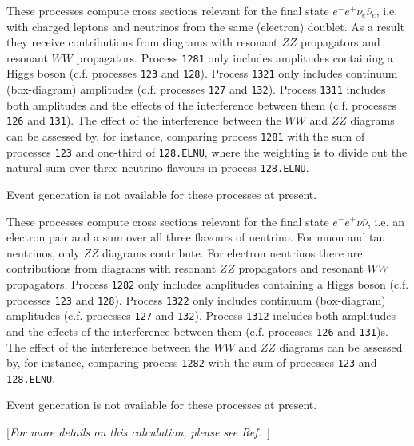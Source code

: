 These processes compute cross sections relevant for the final state
$e^- e^+ \nu_e \bar \nu_e$, i.e. with charged leptons and neutrinos from the
same (electron) doublet.  As a result they receive contributions from diagrams
with resonant $ZZ$ propagators and resonant $WW$ propagators.  Process
{\tt 1281} only includes amplitudes containing a Higgs boson (c.f. processes {\tt 123} and {\tt 128}).
Process {\tt 1321} only includes continuum (box-diagram) amplitudes (c.f. processes {\tt 127} and {\tt 132}).
Process {\tt 1311} includes both amplitudes and the effects of the interference between them (c.f. processes {\tt 126} and {\tt 131}).
The effect of the interference between the $WW$ and $ZZ$ diagrams can be assessed by, for instance, comparing process {\tt 1281} with the sum of processes
{\tt 123} and one-third of {\tt 128.ELNU}, where the weighting is to divide out the natural sum over three neutrino flavours in process {\tt 128.ELNU}.

Event generation is not available for these processes at present.



These processes compute cross sections relevant for the final state
$e^- e^+ \nu \bar \nu$, i.e. an electron pair and a sum over all three
flavours of neutrino.  For muon and tau neutrinos, only $ZZ$ diagrams
contribute.  For electron neutrinos there are contributions from diagrams
with resonant $ZZ$ propagators and resonant $WW$ propagators.  Process
{\tt 1282} only includes amplitudes containing a Higgs boson (c.f. processes
{\tt 123} and {\tt 128}). Process {\tt 1322} only includes continuum (box-diagram) amplitudes (c.f. processes {\tt 127} and {\tt 132}).
Process {\tt 1312} includes both amplitudes and the effects of the interference between them (c.f. processes {\tt 126} and {\tt 131})s.
The effect of the interference between the $WW$ and $ZZ$ diagrams can be assessed by, for instance, comparing process {\tt 1282} with the sum of processes {\tt 123} and {\tt 128.ELNU}.

Event generation is not available for these processes at present.


\label{subsec:Hb}

\begin{center}
[{\it For more details on this calculation, please see Ref.~\cite{Campbell:2002zm}}]
\end{center}

